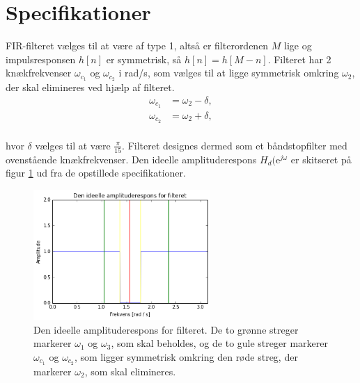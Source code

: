 \section{Specifikationer}
FIR-filteret vælges til at være af type 1, altså er filterordenen $M$ lige og impulsresponsen $h[n]$ er symmetrisk, så $h[n] = h[M - n]$. Filteret har 2 knækfrekvenser $\omega_{c_1}$ og $\omega_{c_2}$ i rad/s, som vælges til at ligge symmetrisk omkring $\omega_2$, der skal elimineres ved hjælp af filteret.
\begin{align*}
\omega_{c_1} &= \omega_2 - \delta, \\
\omega_{c_2} &= \omega_2 + \delta, \\
\end{align*}

hvor $\delta$ vælges til at være $\frac{\pi}{15}$. Filteret designes dermed som et båndstopfilter med ovenstående knækfrekvenser. Den ideelle amplituderespons $H_d(\text{e}^{j\omega}$ er skitseret på figur \ref{fig:ideel_amp_respons} ud fra de opstillede specifikationer.   
\begin{figure}[H]
    \centering
    \includegraphics[width = 0.6\textwidth]{figures/ideel_amp_respons.PNG}
    \caption{Den ideelle amplituderespons for filteret. De to grønne streger markerer $\omega_1$ og $\omega_3$, som skal beholdes, og de to gule streger markerer $\omega_{c_1}$ og $\omega_{c_2}$, som ligger symmetrisk omkring den røde streg, der markerer $\omega_2$, som skal elimineres.}
    \label{fig:ideel_amp_respons}
\end{figure}
